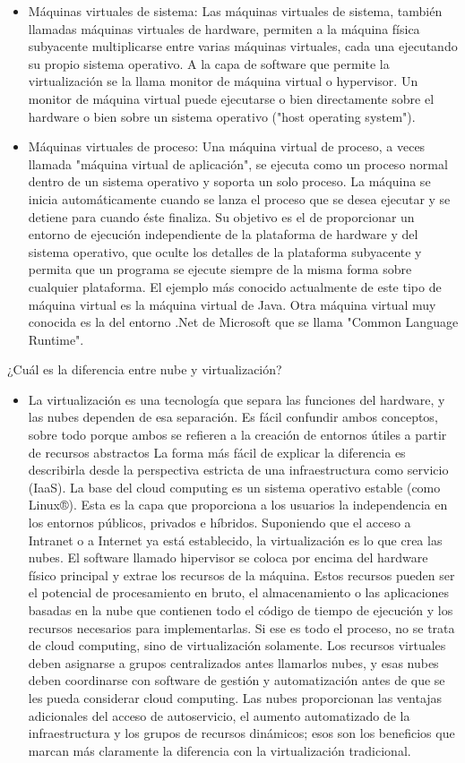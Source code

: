 \documentclass[%
 reprint,
 amsmath,amssymb,
 aps,
]{revtex4-1}
\begin{document}
	\begin{itemize}
		\item Máquinas virtuales de sistema:
Las máquinas virtuales de sistema, también llamadas máquinas virtuales de hardware, permiten a la máquina física subyacente multiplicarse entre varias máquinas virtuales, cada una ejecutando su propio sistema operativo. A la capa de software que permite la virtualización se la llama monitor de máquina virtual o hypervisor. Un monitor de máquina virtual puede ejecutarse o bien directamente sobre el hardware o bien sobre un sistema operativo ("host operating system").
		\item Máquinas virtuales de proceso:
Una máquina virtual de proceso, a veces llamada "máquina virtual de aplicación", se ejecuta como un proceso normal dentro de un sistema operativo y soporta un solo proceso. La máquina se inicia automáticamente cuando se lanza el proceso que se desea ejecutar y se detiene para cuando éste finaliza. Su objetivo es el de proporcionar un entorno de ejecución independiente de la plataforma de hardware y del sistema operativo, que oculte los detalles de la plataforma subyacente y permita que un programa se ejecute siempre de la misma forma sobre cualquier plataforma.
El ejemplo más conocido actualmente de este tipo de máquina virtual es la máquina virtual de Java. Otra máquina virtual muy conocida es la del entorno .Net de Microsoft que se llama "Common Language Runtime".
	\end{itemize}
\par¿Cuál es la diferencia entre nube y virtualización?
	\begin{itemize}
		\item La virtualización es una tecnología que separa las funciones del hardware, y las nubes dependen de esa separación. Es fácil confundir ambos conceptos, sobre todo porque ambos se refieren a la creación de entornos útiles a partir de recursos abstractos
La forma más fácil de explicar la diferencia es describirla desde la perspectiva estricta de una infraestructura como servicio (IaaS). La base del cloud computing es un sistema operativo estable (como Linux®). Esta es la capa que proporciona a los usuarios la independencia en los entornos públicos, privados e híbridos. Suponiendo que el acceso a Intranet o a Internet ya está establecido, la virtualización es lo que crea las nubes. El software llamado hipervisor se coloca por encima del hardware físico principal y extrae los recursos de la máquina. Estos recursos pueden ser el potencial de procesamiento en bruto, el almacenamiento o las aplicaciones basadas en la nube que contienen todo el código de tiempo de ejecución y los recursos necesarios para implementarlas.
Si ese es todo el proceso, no se trata de cloud computing, sino de virtualización solamente. Los recursos virtuales deben asignarse a grupos centralizados antes llamarlos nubes, y esas nubes deben coordinarse con software de gestión y automatización antes de que se les pueda considerar cloud computing. Las nubes proporcionan las ventajas adicionales del acceso de autoservicio, el aumento automatizado de la infraestructura y los grupos de recursos dinámicos; esos son los beneficios que marcan más claramente la diferencia con la virtualización tradicional.
	\end{itemize}
\end{document}
